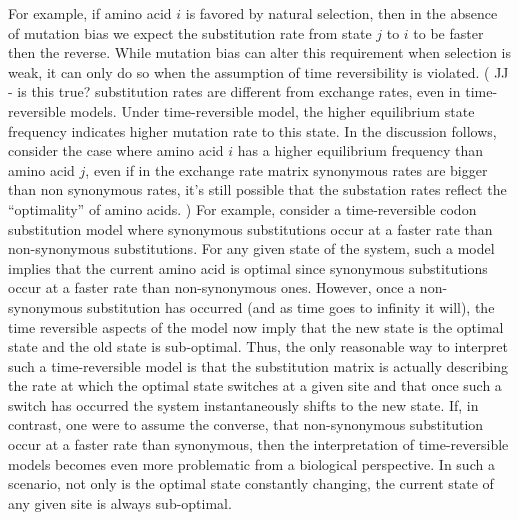 For example, if amino acid $i$ is favored by natural selection, then in the absence of mutation bias we expect the substitution rate from state $j$ to $i$ to be faster then the reverse. 
While mutation bias can alter this requirement when selection is weak, it can only do so when the assumption of time reversibility is violated. ({\color{blue} JJ - is this true? substitution rates are different from exchange rates, even in time-reversible models. Under time-reversible model, the higher equilibrium state frequency indicates higher mutation rate to this state. In the discussion follows, consider the case where amino acid $i$ has a higher equilibrium frequency than amino acid $j$, even if in the exchange rate matrix synonymous rates are bigger than non synonymous rates, it's still possible that the substation rates reflect the ``optimality'' of amino acids. } )
For example, consider a time-reversible codon substitution model where synonymous substitutions occur at a faster rate than non-synonymous substitutions.
For any given state of the system, such a model implies that the current amino acid is optimal since synonymous substitutions occur at a faster rate than non-synonymous ones.
However, once a non-synonymous substitution has occurred (and as time goes to infinity it will),  the time reversible aspects of the model now imply that the new state is the optimal state and the old state is sub-optimal.
Thus, the only reasonable way to interpret such a time-reversible model is that the substitution matrix is actually describing the rate at which the optimal state switches at a given site and that once such a switch has occurred the system instantaneously shifts to the new state.
If, in contrast, one were to assume the converse, that non-synonymous substitution occur at a faster rate than synonymous, then the interpretation of time-reversible models becomes even more problematic from a biological perspective.
In such a scenario, not only is the optimal state constantly changing, the current state of any given site is always sub-optimal.

